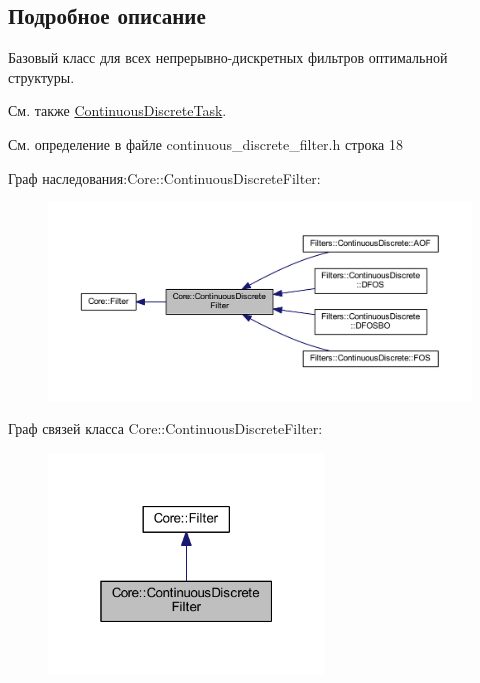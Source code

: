 \subsection{Подробное описание}
Базовый класс для всех непрерывно-\/дискретных фильтров оптимальной структуры. 

\begin{DoxySeeAlso}{См. также}
\hyperlink{class_core_1_1_continuous_discrete_task}{Continuous\+Discrete\+Task}. 
\end{DoxySeeAlso}


См. определение в файле continuous\+\_\+discrete\+\_\+filter.\+h строка 18



Граф наследования\+:Core\+:\+:Continuous\+Discrete\+Filter\+:
\nopagebreak
\begin{figure}[H]
\begin{center}
\leavevmode
\includegraphics[width=350pt]{class_core_1_1_continuous_discrete_filter__inherit__graph}
\end{center}
\end{figure}


Граф связей класса Core\+:\+:Continuous\+Discrete\+Filter\+:
\nopagebreak
\begin{figure}[H]
\begin{center}
\leavevmode
\includegraphics[width=208pt]{class_core_1_1_continuous_discrete_filter__coll__graph}
\end{center}
\end{figure}


